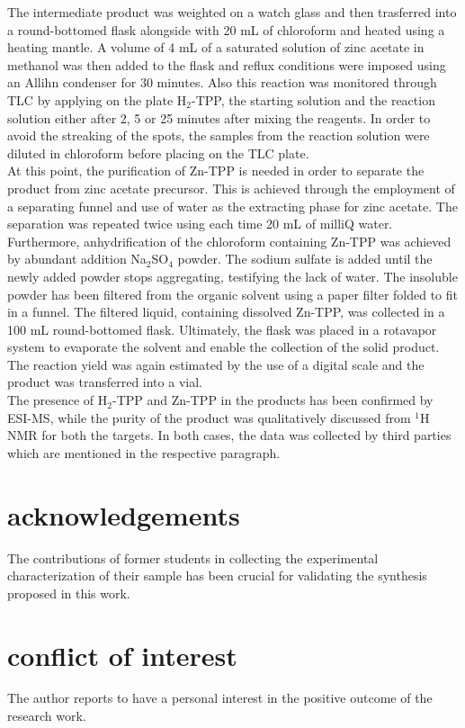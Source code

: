 \documentclass[twoside,twocolumn,9pt]{article}
\begin{document}
The intermediate product was weighted on a watch glass and then trasferred into a round-bottomed flask alongside with 20 mL of chloroform and heated using a heating mantle.
A volume of 4 mL of a saturated solution of zinc acetate in methanol was then added to the flask and reflux conditions were imposed using an Allihn condenser for 30 minutes.
Also this reaction was monitored through TLC by applying on the plate H$_{2}$-TPP, the starting solution and the reaction solution either after 2, 5 or 25 minutes after mixing the reagents.
In order to avoid the streaking of the spots, the samples from the reaction solution were diluted in chloroform before placing on the TLC plate.\\
\break
At this point, the purification of Zn-TPP is needed in order to separate the product from zinc acetate precursor.
This is achieved through the employment of a separating funnel and use of water as the extracting phase for zinc acetate.
The separation was repeated twice using each time 20 mL of milliQ water.
Furthermore, anhydrification of the chloroform containing Zn-TPP was achieved by abundant addition Na$_{2}$SO$_{4}$ powder.
The sodium sulfate is added until the newly added powder stops aggregating, testifying the lack of water.
The insoluble powder has been filtered from the organic solvent using a paper filter folded to fit in a funnel.
The filtered liquid, containing dissolved Zn-TPP, was collected in a 100 mL round-bottomed flask.
Ultimately, the flask was placed in a rotavapor system to evaporate the solvent and enable the collection of the solid product.
The reaction yield was again estimated by the use of a digital scale and the product was transferred into a vial.\\
The presence of H$_{2}$-TPP and Zn-TPP in the products has been confirmed by ESI-MS, while the purity of the product was qualitatively discussed from $^{1}$H NMR for both the targets.
In both cases, the data was collected by third parties which are mentioned in the respective paragraph.

\section*{acknowledgements}
The contributions of former students in collecting the experimental characterization of their sample has been crucial for validating the synthesis proposed in this work.
\section*{conflict of interest}
The author reports to have a personal interest in the positive outcome of the research work.
\end{document}
